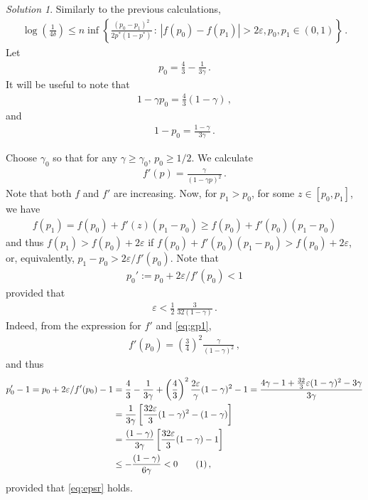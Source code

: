 \documentclass{article}
\newcommand\numberthis{\addtocounter{equation}{1}\tag{\theequation}}
\DeclareMathOperator*{\1}{\mathbbm{1}}
\newcommand{\0}{\mathbf{0}}
\theoremstyle{definition}
\theoremstyle{remark}
\newtheorem*{solution*}{Solution}
\theoremstyle{theorem}
\begin{document}
\begin{solution*}
Similarly to the previous calculations,
\begin{align*}
\log\left(\frac{1}{4\delta}\right) \le n \inf \left\{ \frac{(p_0-p_1)^2}{2 p^*(1-p^*)} \,:\, |f(p_0)-f(p_1)|>2\varepsilon, p_0,p_1\in (0,1)\right\}\,.
\end{align*}
Let
\begin{align*}
p_0 = \frac{4}{3} - \frac{1}{3\gamma}\,.
\end{align*}
It will be useful to note that
\begin{align}
1-\gamma p_0 = \frac{4}{3}(1-\gamma)\,,
\label{eq:gp1}
\end{align}
and
\begin{align}
1- p_0 = \frac{1-\gamma}{3\gamma}\,.
\label{eq:gp2}
\end{align}

Choose $\gamma_0$ so that for any $\gamma \ge \gamma_0$, $p_0\ge 1/2$. 
We calculate
\begin{align*}
f'(p) = \frac{\gamma}{(1-\gamma p)^2}\,.
\end{align*}
Note that both $f$ and $f'$ are increasing.
Now, for $p_1>p_0$, for some $z\in [p_0,p_1]$, we have
\begin{align*}
f(p_1) = f(p_0) + f'(z)(p_1-p_0) \ge f(p_0) + f'(p_0)(p_1-p_0)
\end{align*}
and thus $f(p_1)>f(p_0)+2\varepsilon$ if
$f(p_0) + f'(p_0)(p_1-p_0) >f(p_0)+2\varepsilon$,
or, equivalently,
$p_1-p_0>2\varepsilon/f'(p_0)$.
Note that 
\begin{align}
p_0':=p_0+2\varepsilon/f'(p_0)< 1
\label{eq:p1ub}
\end{align}
provided that
\begin{align}
\varepsilon < \frac{1}{2}\, \frac{3}{32(1-\gamma)}\,.
\label{eq:epsr}
\end{align}
Indeed, from the expression for $f'$ and \cref{eq:gp1},
\begin{align*}
f'(p_0) = \left(\frac34\right)^2 \frac{\gamma}{(1-\gamma)^2}\,,
\end{align*}
and thus
\begin{align*}
p_0'-1 = p_0+2\varepsilon/f'(p_0) -1 
& = \frac{4}{3} - \frac{1}{3\gamma} + \left(\frac43\right)^2 \frac{2\varepsilon}{\gamma} (1-\gamma)^2-1
 = \frac{4\gamma -1 +\frac{32}{3} \varepsilon (1-\gamma)^2 - 3\gamma}{3\gamma}\\
& = \frac{1}{3\gamma} \left[\frac{32\varepsilon}{3} (1-\gamma)^2 - (1-\gamma)\right] \\
& = \frac{(1-\gamma)}{3\gamma} \left[\frac{32\varepsilon}{3} (1-\gamma) - 1\right] \\
& \le  -\frac{(1-\gamma)}{6\gamma} < 0
\numberthis \label{eq:p0ex} 
\,,
\end{align*}
provided that \cref{eq:epsr} holds.


\end{solution*}
\end{document}
